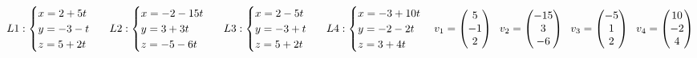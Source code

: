 \subsection{}
\begin{math}
    L1:\begin{cases}
        x=2+5t\\
        y=-3-t\\
        z=5+2t
    \end{cases}
    \hspace{6px}
    L2:\begin{cases}
        x=-2-15t\\
        y=3+3t\\
        z=-5-6t
    \end{cases}
    \hspace{6px}
    L3:\begin{cases}
        x=2-5t\\
        y=-3+t\\
        z=5+2t
    \end{cases}
    \hspace{6px}
    L4:\begin{cases}
        x=-3+10t\\
        y=-2-2t\\
        z=3+4t
    \end{cases}
    \\
    v_1=\begin{pmatrix}
        5\\
        -1\\
        2
    \end{pmatrix}
    \hspace{6px}
    v_2=\begin{pmatrix}
        -15\\
        3\\
        -6
    \end{pmatrix}
    \hspace{6px}
    v_3=\begin{pmatrix}
        -5\\
        1\\
        2
    \end{pmatrix}
    \hspace{6px}
    v_4=\begin{pmatrix}
        10\\
        -2\\
        4
    \end{pmatrix}
\end{math}
